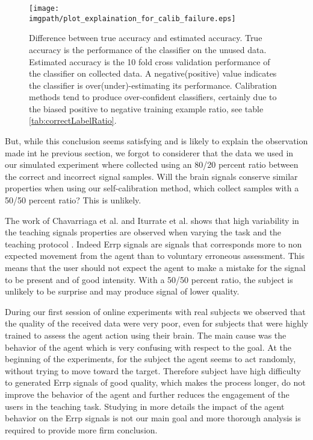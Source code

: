 \begin{figure}[!htbp]
\centering
\texttt{[image: \\imgpath/plot\_explaination\_for\_calib\_failure.eps]}
\caption{Difference between true accuracy and estimated accuracy. True accuracy is the performance of the classifier on the unused data. Estimated accuracy is the 10 fold cross validation performance of the classifier on collected data. A negative(positive) value indicates the classifier is over(under)-estimating its performance. Calibration methods tend to produce over-confident classifiers, certainly due to the biased positive to negative training example ratio, see table \ref{tab:correctLabelRatio}.}
\label{fig:calibFail}
\end{figure}

But, while this conclusion seems satisfying and is likely to explain the observation made int he previous section, we forgot to considerer that the data we used in our simulated experiment where collected using an 80/20 percent ratio between the correct and incorrect signal samples. Will the brain signals conserve similar properties when using our self-calibration method, which collect samples with a 50/50 percent ratio? This is unlikely. 

The work of Chavarriaga et al. and Iturrate et al. shows that high variability in the teaching signals properties are observed when varying the task and the teaching protocol \cite{chavarriaga2010learning, iturrate2013task}. Indeed Errp signals are signals that corresponds more to non expected movement from the agent than to voluntary erroneous assessment. This means that the user should not expect the agent to make a mistake for the signal to be present and of good intensity. With a 50/50 percent ratio, the subject is unlikely to be surprise and may produce signal of lower quality.

During our first session of online experiments with real subjects we observed that the quality of the received data were very poor, even for subjects that were highly trained to assess the agent action using their brain. The main cause was the behavior of the agent which is very confusing with respect to the goal. At the beginning of the experiments, for the subject the agent seems to act randomly, without trying to move toward the target. Therefore subject have high difficulty to generated Errp signals of good quality, which makes the process longer, do not improve the behavior of the agent and further reduces the engagement of the users in the teaching task. Studying in more details the impact of the agent behavior on the Errp signals is not our main goal and more thorough analysis is required to provide more firm conclusion.

